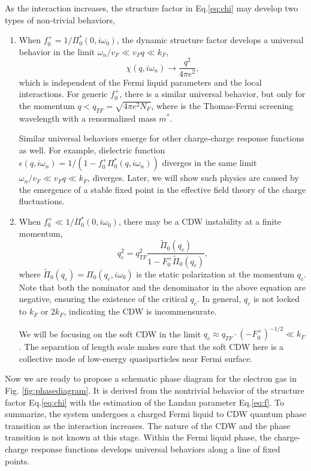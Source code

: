 \documentclass[reprint,amsmath,amssymb,aps,prb]{revtex4-1}
\begin{document}
As the interaction increases, the structure factor in Eq.\eqref{eq:chi} may develop two types of non-trivial behaviors,
\begin{enumerate}
    \item When $f_0^+=1/\Pi_0^* (0, i\omega_0)$, the dynamic structure factor develops a universal behavior in the limit $\omega_n/v_F \ll v_F q \ll k_F$,
          \begin{equation}
              \chi(q, i\omega_n) \rightarrow \frac{q^2}{4\pi e^2},
          \end{equation}
          which is independent of the Fermi liquid parameters and the local interactions. For generic $f_0^+$, there is a similar universal behavior, but only for the momentum $q<q_{TF}=\sqrt{4\pi e^2 N_F}$, where is the Thomas-Fermi screening wavelength with a renormalized mass $m^*$.

          Similar universal behaviors emerge for other charge-charge response functions as well. For example, dielectric function $\epsilon(q,i\omega_n)=1/(1-f_0^+ \Pi^*_0 (q,i\omega_n))$ diverges in the same limit $\omega_n/v_F \ll v_F q \ll k_F$, diverges. Later, we will show such physics are caused by the emergence of a stable fixed point in the effective field theory of the charge fluctuations.

    \item When $f_0^+ \ll 1/\Pi_0^* (0, i\omega_0)$, there may be a CDW instability at a finite momentum,
          \begin{equation}
              q_c^2=q_{TF}^2\frac{\tilde{\Pi}_0({q_c})}{1-F_0^+ \tilde{\Pi}_0({q_c})},
          \end{equation}
          where $\tilde{\Pi}_0({q_c})=\Pi_0(q_c, i\omega_0)$ is the static polarization at the momentum $q_c$. Note that both the nominator and the denominator in the above equation are negative, ensuring the existence of the critical $q_c$. In general, $q_c$ is not locked to $k_F$ or $2k_F$, indicating the CDW is incommensurate.

          We will be focusing on the soft CDW in the limit $q_c \approx q_{TF}\cdot(-F_0^+)^{-1/2} \ll k_F$. The separation of length scale makes sure that the soft CDW here is a collective mode of low-energy quasiparticles near Fermi surface.

\end{enumerate}

Now we are ready to propose a schematic phase diagram for the electron gas in Fig. \ref{fig:phasediagram}. It is derived from the nontrivial behavior of the structure factor Eq.\eqref{eq:chi} with the estimation of the Landau parameter Eq.\eqref{eq:f}. To summarize, the system undergoes a charged Fermi liquid to CDW quantum phase transition as the interaction increases. The nature of the CDW and the phase transition is not known at this stage. Within the Fermi liquid phase, the charge-charge response functions develops universal behaviors along a line of fixed points.
\end{document}
